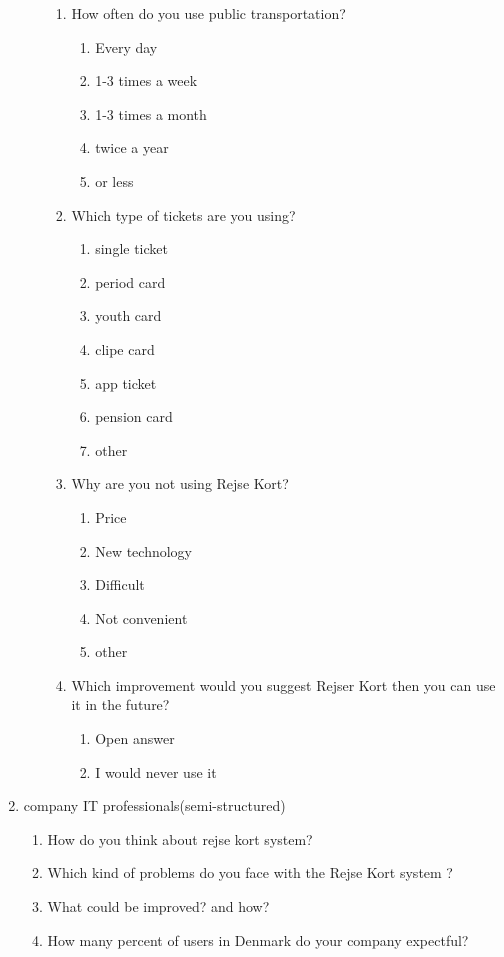 \begin{enumerate}
\begin{enumerate}
\begin{enumerate}
			\item How often do you use public transportation?
			\begin{enumerate}
				\item Every day
				\item 1-3 times a week
				\item 1-3 times a month
				\item twice a year
				\item or less
			\end{enumerate}
			
			\item Which type of tickets are you using?
			\begin{enumerate}
				\item single ticket
				\item period card
				\item youth card
				\item clipe card
				\item app ticket
				\item pension card
				\item other
			\end{enumerate}
			
			\item Why are you not using Rejse Kort?
			\begin{enumerate}
				\item Price
				\item New technology
				\item Difficult
				\item Not convenient
				\item other
			\end{enumerate}
			
			\item Which improvement would you suggest Rejser Kort then you can use it in the future?
			\begin{enumerate}
				\item Open answer
				\item I would never use it
			\end{enumerate}
			
		\end{enumerate}		
	\end{enumerate}
	
	\item company IT professionals(semi-structured)
		\begin{enumerate}
			\item How do you think about rejse kort system?
			\item Which kind of problems do you face with the Rejse Kort system ?
			\item What could be improved? and how?
			\item How many percent of users in Denmark do your company expectful? 
		\end{enumerate}
		

\end{enumerate}
